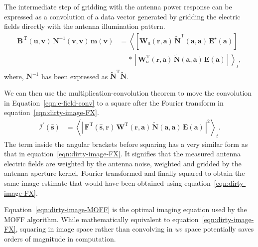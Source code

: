 \documentclass[a4paper,fleqn,usenatbib]{mnras}
\begin{document}
The intermediate step of gridding with the antenna power response can be expressed as a convolution of a data vector generated by gridding the electric fields directly with the antenna illumination pattern.
\begin{align}
\mathbf{B}^{\,\textrm{T}}(\mathbf{u},\mathbf{v})\,\mathbf{N}^{-1}(\mathbf{v} ,\mathbf{v})\,\mathbf{m}(\mathbf{v}) &= \left\langle \left[\mathbf{W}_a(\mathbf{r},\mathbf{a})\,\widetilde{\mathbf{N}}^\textrm{T}\!(\mathbf{a},\mathbf{a})\, \mathbf{E}^\star(\mathbf{a})\right]\right. \nonumber\\ 
&\,\quad\ast\left.\left[\mathbf{W}^\textrm{T}_a(\mathbf{r},\mathbf{a})\,\widetilde{\mathbf{N}}\!(\mathbf{a},\mathbf{a})\,\mathbf{E}(\mathbf{a})\right]\right\rangle_t, \label{eqn:e-field-conv}
\end{align}
where, $\mathbf{N}^{-1}$ has been expressed as $\widetilde{\mathbf{N}}^\textrm{T}\widetilde{\mathbf{N}}$.

We can then use the multiplication-convolution theorem to move the convolution in Equation~\ref{eqn:e-field-conv} to a square after the Fourier transform in equation~\ref{eqn:dirty-image-FX}.
\begin{align}
  \boldsymbol{\mathcal{I}}^\prime(\hat{\mathbf{s}}) &= \left\langle \left|\,\mathbf{F}^\textrm{T}(\hat{\mathbf{s}},\mathbf{r})\,\mathbf{W}^\textrm{T}(\mathbf{r},\mathbf{a})\,\widetilde{\mathbf{N}}(\mathbf{a},\mathbf{a})\,\mathbf{E}(\mathbf{a})\,\right|^2\right\rangle_t. \label{eqn:dirty-image-MOFF}
\end{align}
The term inside the angular brackets before squaring has a very similar form as that in equation~\ref{eqn:dirty-image-FX}. It signifies that the measured antenna electric fields are weighted by the antenna noise, weighted and gridded by the antenna aperture kernel, Fourier transformed and finally squared to obtain the same image estimate that would have been obtained using equation~\ref{eqn:dirty-image-FX}. 

Equation~\ref{eqn:dirty-image-MOFF} is the optimal imaging equation used by the MOFF algorithm. While mathematically equivalent to equation~\ref{eqn:dirty-image-FX}, squaring in image space rather than convolving in $uv$ space potentially saves orders of magnitude in computation.
\end{document}
